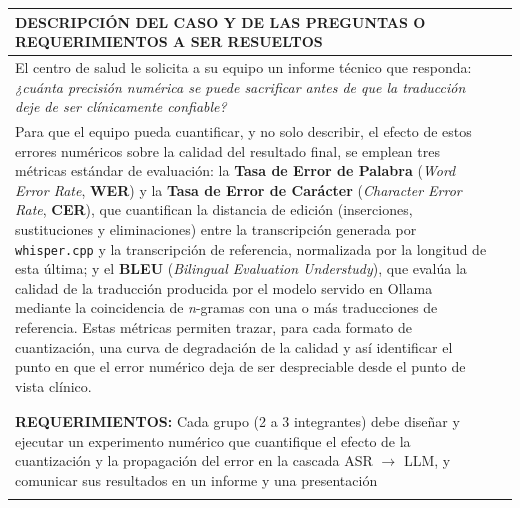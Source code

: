 \documentclass[12pt]{article}
\begin{document}
\newpage
\noindent
\begin{longtable}{|p{\textwidth}|@{}c@{}}
  \hline
  \centering\cellcolor{cyan}\textbf{\color{white}DESCRIPCIÓN DEL CASO Y DE LAS PREGUNTAS O REQUERIMIENTOS A SER RESUELTOS}&\\\hline
  \endhead
  El centro de salud le solicita a su equipo un informe técnico que responda: \textit{¿cuánta precisión
  numérica se puede sacrificar antes de que la traducción deje de ser clínicamente confiable?}
   &\\
  Para que el equipo pueda cuantificar, y no solo describir, el efecto de estos errores numéricos sobre la
  calidad del resultado final, se emplean tres métricas estándar de evaluación: la \textbf{Tasa de Error de
  Palabra} (\textit{Word Error Rate}, \textbf{WER}) y la \textbf{Tasa de Error de Carácter} (\textit{Character
  Error Rate}, \textbf{CER}), que cuantifican la distancia de edición (inserciones, sustituciones y
  eliminaciones) entre la transcripción generada por \texttt{whisper.cpp} y la transcripción de referencia,
  normalizada por la longitud de esta última; y el \textbf{BLEU} (\textit{Bilingual Evaluation Understudy}),
  que evalúa la calidad de la traducción producida por el modelo servido en Ollama mediante la coincidencia de
  \textit{n}-gramas con una o más traducciones de referencia. Estas métricas permiten trazar, para cada formato
  de cuantización, una curva de degradación de la calidad y así identificar el punto en que el error numérico
  deja de ser despreciable desde el punto de vista clínico.
  &\\
  &\\

  &\\\hline
    \textbf{REQUERIMIENTOS:}
  \vspace{3pt}
  Cada grupo (2 a 3 integrantes) debe diseñar y ejecutar un experimento numérico que cuantifique el
  efecto de la cuantización y la propagación del error en la cascada ASR $\to$ LLM, y comunicar sus
  resultados en un informe y una presentación
  &\\&\\\hline
\end{longtable}
\end{document}
